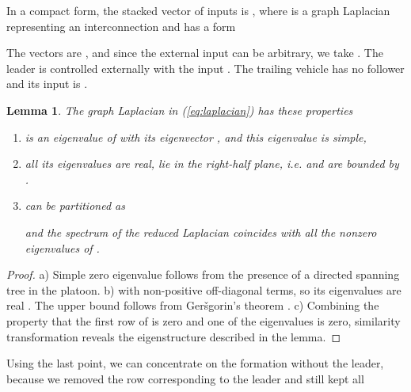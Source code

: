 \documentclass[technote, 10pt, twoside]{IEEEtran}
\theoremstyle{plain}
\newtheorem{lemma}{Lemma}
\theoremstyle{definition}
\theoremstyle{assump}
\begin{document}
In a compact form, the stacked vector of inputs is , where  is a graph Laplacian representing an interconnection and has a form 
\vspace{-5pt}

{
\setlength{\arraycolsep}{2pt}

}
\setlength{\arraycolsep}{3pt}

The vectors are ,
 and since the external input
can be arbitrary, we take . The leader
is controlled externally with the input . The trailing vehicle has no
follower and its input is .

\begin{lemma}
	The graph Laplacian in (\ref{eq:laplacian}) has these properties
	\begin{enumerate}
	  \item[a)]  is an eigenvalue of  with its eigenvector
	  , and this eigenvalue is simple,
	  \item[b)] all its eigenvalues are real, lie in the right-half plane, i.e.
	   and are bounded by .
	  \item[c)]  can be partitioned as
	  
	and the spectrum of the reduced Laplacian  coincides with all the
	nonzero eigenvalues of .
	\end{enumerate}
	\label{lem:lapProp}
\end{lemma} 
\begin{proof}
a) Simple zero eigenvalue follows from the presence of a directed spanning tree
in the platoon. b)   with non-positive off-diagonal terms, so its eigenvalues
are real \cite[Lem.
0.1.1]{Fallat2011}.
The upper bound follows from Ger\v{s}gorin's theorem \cite[Thm.
6.1.1]{Horn1996}. c) Combining the property that the first row of  is
zero and one of the eigenvalues is zero, similarity transformation reveals the
eigenstructure described in the lemma.
\end{proof}	
	Using the last point, we can concentrate on the formation without the
	leader, because we removed the row corresponding to the leader and still kept all
\end{document}
